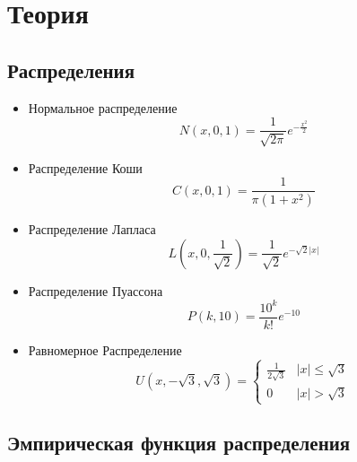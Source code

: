 \documentclass[12pt,a4paper]{article}
\begin{document}
	\section{Теория}
	\subsection{Распределения}
	\begin{itemize}
		\item Нормальное распределение \begin{equation}\label{eqn:normal}
		N(x,0,1) = \frac{1}{\sqrt{2\pi}}e^{-\frac{x^2}{2}}
		\end{equation}
		
		\item Распределение Коши
		\begin{equation}\label{eqn:cauchy}
		C(x,0,1) = \frac{1}{\pi(1+x^2)}
		\end{equation}
		
		\item Распределение Лапласа
		\begin{equation}\label{eqn:laplace}
		L\left( x,0,\frac{1}{\sqrt{2}}\right) = \frac{1}{\sqrt{2}}e^{-\sqrt{2}\vert x\vert}
		\end{equation}
		
		\item Распределение Пуассона
		\begin{equation}\label{eqn:poisson}
		P(k,10) = \frac{10^k}{k!}e^{-10}
		\end{equation}
		
		\item Равномерное Распределение
		\begin{equation}\label{eqn:uniform}
		U(x,-\sqrt{3}, \sqrt{3}) = 
		\begin{cases}
		\frac{1}{2\sqrt{3}} &\vert x\vert \leqslant \sqrt{3}\\
		0 &\vert x\vert > \sqrt{3}
		\end{cases}
		\end{equation}
	\end{itemize}
	
	\subsection{Эмпирическая функция распределения}
\end{document}
